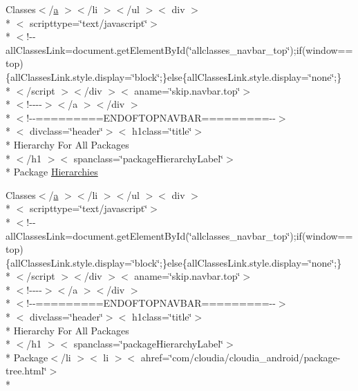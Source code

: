 \begin{DoxyCompactItemize}
\item 
Classes$<$/\hyperlink{style_8css_a5e8981582017bb8b84c21f148345d1f7}{a} $>$$<$/li $>$$<$/ul $>$$<$ div $>$\\*
$<$ scripttype=\char`\"{}text/javascript\char`\"{}$>$\\*
$<$!-\/-\/all\-Classes\-Link=document.\-get\-Element\-By\-Id(\char`\"{}allclasses\-\_\-navbar\-\_\-top\char`\"{});if(window==top)\{all\-Classes\-Link.\-style.\-display=\char`\"{}block\char`\"{};\}else\{all\-Classes\-Link.\-style.\-display=\char`\"{}none\char`\"{};\}\\*
$<$/script $>$$<$/div $>$$<$ aname=\char`\"{}skip.\-navbar.\-top\char`\"{}$>$\\*
$<$!-\/-\/-\/-\/$>$$<$/a $>$$<$/div $>$\\*
$<$!-\/-\/=========E\-N\-D\-O\-F\-T\-O\-P\-N\-A\-V\-B\-A\-R=========-\/-\/$>$\\*
$<$ divclass=\char`\"{}header\char`\"{}$>$$<$ h1class=\char`\"{}title\char`\"{}$>$\\*
 Hierarchy For All Packages\\*
$<$/h1 $>$$<$ spanclass=\char`\"{}package\-Hierarchy\-Label\char`\"{}$>$\\*
 Package \hyperlink{overview-tree_8html_ad90915afb629507b424558e50a736daf}{Hierarchies}
\item 
Classes$<$/\hyperlink{style_8css_a5e8981582017bb8b84c21f148345d1f7}{a} $>$$<$/li $>$$<$/ul $>$$<$ div $>$\\*
$<$ scripttype=\char`\"{}text/javascript\char`\"{}$>$\\*
$<$!-\/-\/all\-Classes\-Link=document.\-get\-Element\-By\-Id(\char`\"{}allclasses\-\_\-navbar\-\_\-top\char`\"{});if(window==top)\{all\-Classes\-Link.\-style.\-display=\char`\"{}block\char`\"{};\}else\{all\-Classes\-Link.\-style.\-display=\char`\"{}none\char`\"{};\}\\*
$<$/script $>$$<$/div $>$$<$ aname=\char`\"{}skip.\-navbar.\-top\char`\"{}$>$\\*
$<$!-\/-\/-\/-\/$>$$<$/a $>$$<$/div $>$\\*
$<$!-\/-\/=========E\-N\-D\-O\-F\-T\-O\-P\-N\-A\-V\-B\-A\-R=========-\/-\/$>$\\*
$<$ divclass=\char`\"{}header\char`\"{}$>$$<$ h1class=\char`\"{}title\char`\"{}$>$\\*
 Hierarchy For All Packages\\*
$<$/h1 $>$$<$ spanclass=\char`\"{}package\-Hierarchy\-Label\char`\"{}$>$\\*
 Package$<$/li $>$$<$ li $>$$<$ ahref=\char`\"{}com/cloudia/cloudia\-\_\-android/package-\/tree.\-html\char`\"{}$>$\\*

\end{DoxyCompactItemize}
